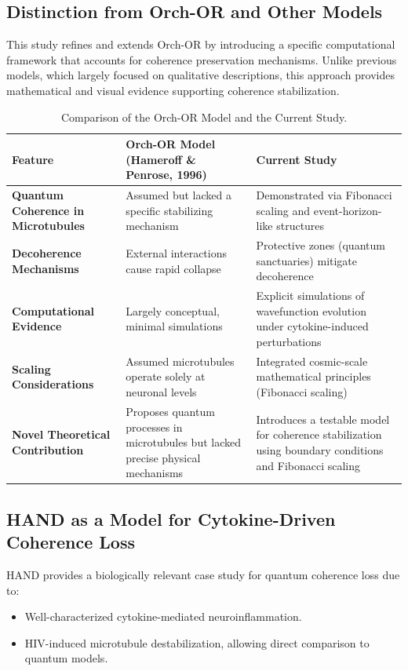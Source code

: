 \documentclass[entropy,article,submit,oneauthor,pdftex]{Definitions/mdpi}
\begin{document}
\subsection{Distinction from Orch-OR and Other Models}
This study refines and extends Orch-OR by introducing a specific computational framework that accounts for coherence preservation mechanisms. Unlike previous models, which largely focused on qualitative descriptions, this approach provides mathematical and visual evidence supporting coherence stabilization.
\begin{table}[H]
\centering
\caption{Comparison of the Orch-OR Model and the Current Study.}
\label{tab:orch_or_comparison}
\begin{tabular}{|p{3.8cm}|p{3.8cm}|p{3.8cm}|}
\hline
\textbf{Feature} & \textbf{Orch-OR Model (Hameroff \& Penrose, 1996)} & \textbf{Current Study} \\
\hline
\textbf{Quantum Coherence in Microtubules} & Assumed but lacked a specific stabilizing mechanism & Demonstrated via Fibonacci scaling and event-horizon-like structures \\
\hline
\textbf{Decoherence Mechanisms} & External interactions cause rapid collapse & Protective zones (quantum sanctuaries) mitigate decoherence \\
\hline
\textbf{Computational Evidence} & Largely conceptual, minimal simulations & Explicit simulations of wavefunction evolution under cytokine-induced perturbations \\
\hline
\textbf{Scaling Considerations} & Assumed microtubules operate solely at neuronal levels & Integrated cosmic-scale mathematical principles (Fibonacci scaling) \\
\hline
\textbf{Novel Theoretical Contribution} & Proposes quantum processes in microtubules but lacked precise physical mechanisms & Introduces a testable model for coherence stabilization using boundary conditions and Fibonacci scaling \\
\hline
\end{tabular}
\end{table}

\subsection{HAND as a Model for Cytokine-Driven Coherence Loss}
HAND provides a biologically relevant case study for quantum coherence loss due to:
\begin{itemize}
    \item Well-characterized cytokine-mediated neuroinflammation.
    \item HIV-induced microtubule destabilization, allowing direct comparison to quantum models.
\end{itemize}
\end{document}
